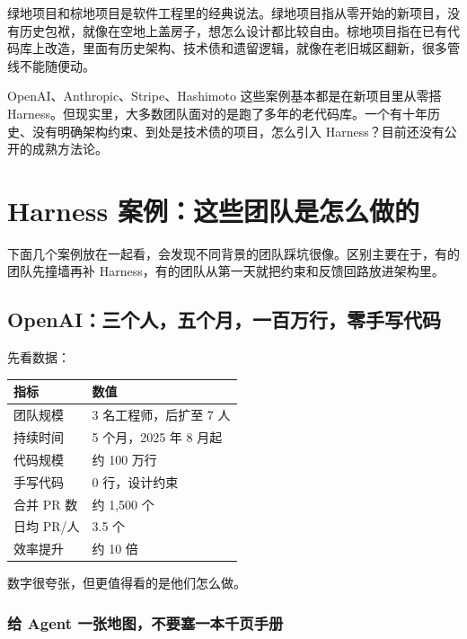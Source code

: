 \documentclass[9pt,a4paper,twocolumn]{ctexart}
\begin{document}
绿地项目和棕地项目是软件工程里的经典说法。绿地项目指从零开始的新项目，没有历史包袱，就像在空地上盖房子，想怎么设计都比较自由。棕地项目指在已有代码库上改造，里面有历史架构、技术债和遗留逻辑，就像在老旧城区翻新，很多管线不能随便动。



OpenAI、Anthropic、Stripe、Hashimoto 这些案例基本都是在新项目里从零搭 Harness。但现实里，大多数团队面对的是跑了多年的老代码库。一个有十年历史、没有明确架构约束、到处是技术债的项目，怎么引入 Harness？目前还没有公开的成熟方法论。



\section*{Harness 案例：这些团队是怎么做的}


下面几个案例放在一起看，会发现不同背景的团队踩坑很像。区别主要在于，有的团队先撞墙再补 Harness，有的团队从第一天就把约束和反馈回路放进架构里。



\subsection*{OpenAI：三个人，五个月，一百万行，零手写代码}


先看数据：


{\footnotesize
\begin{tabular}{|p{}|p{}|}
\hline
\textbf{指标} & \textbf{数值} \\
\hline
团队规模 & 3 名工程师，后扩至 7 人 \\
\hline
持续时间 & 5 个月，2025 年 8 月起 \\
\hline
代码规模 & 约 100 万行 \\
\hline
手写代码 & 0 行，设计约束 \\
\hline
合并 PR 数 & 约 1,500 个 \\
\hline
日均 PR/人 & 3.5 个 \\
\hline
效率提升 & 约 10 倍 \\
\hline
\end{tabular}
}



数字很夸张，但更值得看的是他们怎么做。



\subsubsection{给 Agent 一张地图，不要塞一本千页手册}
\end{document}
